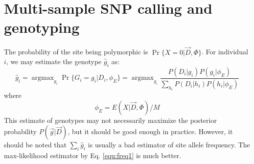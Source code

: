 \documentclass[pdftex,10pt]{book}
\DeclareMathOperator*{\argmax}{argmax}
\begin{document}
\section{Multi-sample SNP calling and genotyping}

The probability of the site being polymorphic is
$\Pr\{X=0|\vec{D},\Phi\}$. For individual $i$, we may estimate the
genotype $\hat{g}_i$ as:
$$
\hat{g}_i=\argmax_{g_i} \Pr\{G_i=g_i|D_i,\phi_E\}=\argmax_{g_i}\frac{P(D_i|g_i)P(g_i|\phi_E)}
{\sum_{h_i}P(D_i|h_i)P(h_i|\phi_E)}
$$
where
$$
\phi_E=E(X|\vec{D},\Phi)/M
$$
This estimate of genotypes may not necessarily maximize the posterior
probability $P(\vec{g}|\vec{D})$, but it should be good enough in
practice. However, it should be noted that $\sum_i\hat{g}_i$ is usually
a bad estimator of site allele frequency. The max-likelihood estimator
by Eq. \eqref{equ:freq1} is much better.
\end{document}
